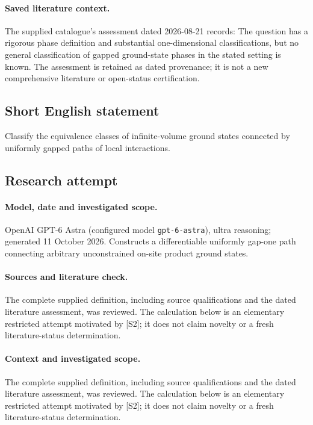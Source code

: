 \documentclass[11pt]{article}
\begin{document}
\paragraph{Saved literature context.} The supplied catalogue's assessment dated 2026-08-21 records: The question has a rigorous phase definition and substantial one-dimensional classifications, but no general classification of gapped ground-state phases in the stated setting is known. The assessment is retained as dated provenance; it is not a new comprehensive literature or open-status certification.
\subsection{Short English statement}
Classify the equivalence classes of infinite-volume ground states connected by uniformly gapped paths of local interactions.
\subsection{Research attempt}
\paragraph{Model, date and investigated scope.}
OpenAI GPT-6 Astra (configured model \texttt{gpt-6-astra}), ultra reasoning; generated 11 October 2026. Constructs a differentiable uniformly gap-one path connecting arbitrary unconstrained on-site product ground states.

\paragraph{Sources and literature check.}
The complete supplied definition, including source qualifications and the dated literature assessment, was reviewed. The calculation below is an elementary restricted attempt motivated by [S2]; it does not claim novelty or a fresh literature-status determination.

\paragraph{Context and investigated scope.} The complete supplied definition, including source qualifications and the dated literature assessment, was reviewed. The calculation below is an elementary restricted attempt motivated by [S2]; it does not claim novelty or a fresh literature-status determination.
\end{document}
